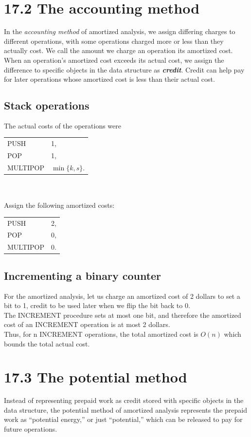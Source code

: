 \documentclass[a4paper]{article}
\begin{document}
\section*{17.2 The accounting method}
In the \textit{accounting method} of amortized analysis, we assign differing charges to different operations, with some operations charged more or less than they actually cost. We call the amount we charge an operation its amortized cost. When an operation’s amortized cost exceeds its actual cost, we assign the difference to specific objects in the data structure as \textit{\textbf{credit}}. Credit can help pay for later operations whose amortized cost is less than their actual cost.
\subsection*{Stack operations}
The actual costs of the operations were\\
\begin{tabular}{ll}
    PUSH &  1,\\
    POP & 1,\\
    MULTIPOP & $\min\{k,s\}$.
\end{tabular}\\
\\
Assign the following amortized costs:\\
\begin{tabular}{lc}
    PUSH &  2,\\
    POP & 0,\\
    MULTIPOP & 0.
\end{tabular}
\subsection*{Incrementing a binary counter}
For the amortized analysis, let us charge an amortized cost of 2 dollars to set a bit to 1, credit to be used later when we flip the bit back to 0.\\
The INCREMENT procedure sets at most one bit, and therefore the amortized cost of an INCREMENT operation is at most 2 dollars.\\
Thus, for n INCREMENT operations, the total amortized cost is $O(n)$
which bounds the total actual cost.
\section*{17.3 The potential method}
Instead of representing prepaid work as credit stored with specific objects in the data structure, the potential method of amortized analysis represents the prepaid work as “potential energy,” or just “potential,” which can be released to pay for future operations.
\end{document}
